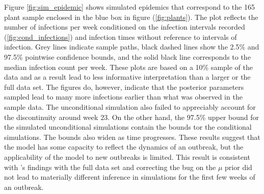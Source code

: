 \documentclass{uwstat572}
\begin{document}
Figure \ref{fig:sim_epidemic} shows simulated epidemics that correspond to the 165 plant sample enclosed in the blue box in figure (\ref{fig:plants}). 
The plot reflects the number of infections per week conditioned on the infection intervals recorded (\ref{fig:cond_infections}) and infection times without reference to intervals of infection. 
Grey lines indicate sample paths, black dashed lines show the 2.5\% and 97.5\% pointwise confidence bounds, and the solid black line corresponds to the median infection count per week. 
These plots are based on a 10\% sample of the data and as a result lead to less informative interpretation than a larger or the full data set. 
The figures do, however, indicate that the posterior parameters sampled lead to many more infections earlier than what was observed in the sample data. 
The unconditional simulation also failed to appreciably account for the discontinuity around week 23. 
On the other hand, the 97.5\% upper bound for the simulated unconditional simulations contain the bounds tor the conditional simulations. 
The bounds also widen as time progresses. 
These results suggest that the model has some capacity to reflect the dynamics of an outbreak, but the applicability of the model to new outbreaks is limited.
This result is consistent with \citet{Brown}'s findings with the full data set and correcting the bug on the $\mu$ prior did not lead to materially different inference in simulations for the first few weeks of an outbreak. 
\end{document}
